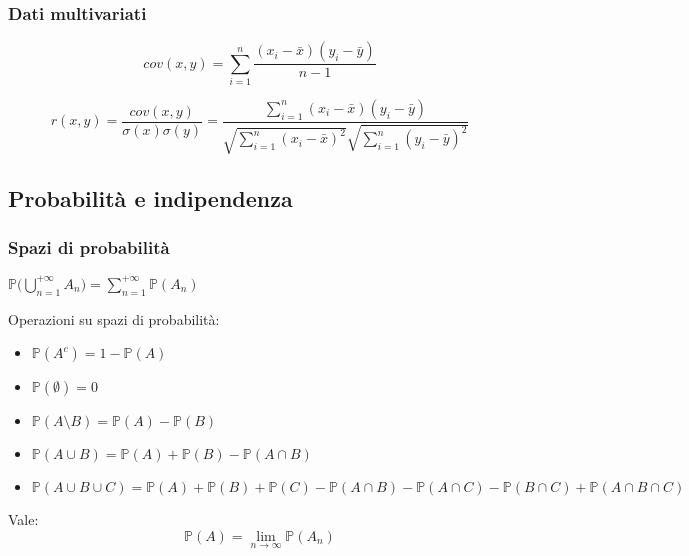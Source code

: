 \subsubsection{Dati multivariati}
\begin{definition}
	\begin{equation}
		cov(x,y)=\sum_{i=1}^{n}\frac{(x_i - \bar{x})(y_i-\bar{y})}{n-1}
	\end{equation}
\end{definition}
\begin{definition}
	\begin{equation}
		r(x,y)=\frac{cov(x,y)}{\sigma(x)\sigma(y)} = \frac{\sum_{i=1}^{n}(x_i - \bar{x})(y_i - \bar{y})}{\sqrt{\sum_{i=1}^{n}(x_i - \bar{x})^2} \sqrt{\sum_{i=1}^{n}(y_i - \bar{y})^2}}
	\end{equation}
\end{definition}

\subsection{Probabilità e indipendenza}
\subsubsection{Spazi di probabilità}
\begin{definition}
	$\mathbb{P}\bigg(\bigcup_{n=1}^{+\infty}A_n\bigg) = \sum_{n=1}^{+\infty} \mathbb{P}(A_n)$
\end{definition}
\begin{proposition}
	Operazioni su spazi di probabilità:
	\begin{itemize}
		\item $\mathbb{P}(A^c) = 1-\mathbb{P}(A)$
		\item $\mathbb{P}(\emptyset) = 0$
		\item $\mathbb{P}(A \setminus B) = \mathbb{P}(A)-\mathbb{P}(B)$
		\item $\mathbb{P}(A \cup B) = \mathbb{P}(A) + \mathbb{P}(B) - \mathbb{P}(A \cap B)$
		\item $\mathbb{P}(A \cup B \cup C) = \mathbb{P}(A) + \mathbb{P}(B) + \mathbb{P}(C) - \mathbb{P}(A \cap B) - \mathbb{P}(A \cap C) - \mathbb{P}(B \cap C) + \mathbb{P}(A \cap B \cap C)$
	\end{itemize}
\end{proposition}

\begin{proposition}
	Vale:
	\begin{equation}
		\mathbb{P}(A) = \lim_{n \to \infty} \mathbb{P}(A_n)
	\end{equation}
\end{proposition}

